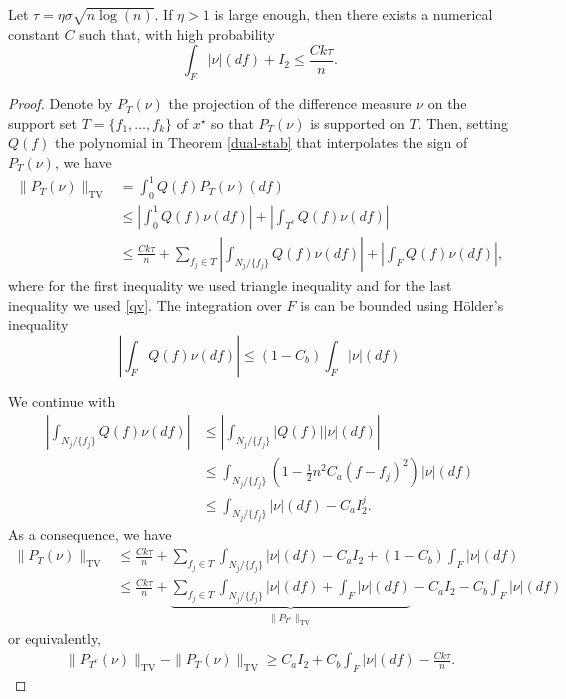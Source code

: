 \begin{lemma}
Let $\tau = \eta\sigma \sqrt{n\log(n)}$. If $\eta>1$ is large enough, then there exists a numerical constant $C$ such that, with high probability
\label{part3}
\[
\int_F{|\nu|(df)} + I_2 \leq \frac{C k \tau}{n}.
\]
\end{lemma}
\begin{proof}\label{apx:pf:I2far}
Denote by $P_T(\nu)$ the projection of the difference measure $\nu$ on the support set $T = \{f_1, \ldots, f_k\}$ of $x^\star$ so that $P_T(\nu)$ is supported on $T$. Then, setting $Q(f)$ the polynomial in Theorem \ref{dual-stab} that interpolates the sign of $P_T( \nu)$, we have
{
\begin{align*}
  \| P_T ( \nu) \|_{\mathrm{TV}} & =  \int_0^1 Q ( f) P_T ( \nu) ( d f)\\
  & \leq  \left| \int_0^1 Q ( f) \nu ( d f) \right| + \left|
  \int_{T^c} Q ( f) \nu ( d f) \right|\\
  & \leq  \frac{C k \tau}{n} + \sum_{f_j \in T} \left|
  \int_{N_j / \{ f_j \}} Q ( f) \nu ( d f) \right| + \left|
  \int_F Q ( f) \nu ( d f) \right|,
\end{align*}}
where for the first inequality we used triangle inequality and for the last inequality we used \eqref{qv}. 
The integration over $F$ is can be bounded using H\"{o}lder's inequality
\[
  \left| \int_{F} Q ( f) \nu ( d f) \right|  
  \leq  ( 1 - C_b) \int_F |\nu|(df)
\]

We continue with
{
\begin{align*}
  \left| \int_{N_j / \{ f_j \}} Q ( f) \nu ( d f) \right| 
  & \leq  \left| \int_{N_j / \{ f_j \}} | Q ( f) | | \nu | ( d f) \right|\\
  & \leq  \int_{N_j / \{ f_j \}} ( 1 - \tfrac{1}{2}n^2 C_a ( f - f_j)^2) | \nu | ( d f)\\
  & \leq \int_{N_j / \{ f_j \}} | \nu | ( d f) - C_a I_2^j.
\end{align*}
}
As a consequence, we have
{
\begin{align*}
  \nonumber \| P_T ( \nu) \|_{\mathrm{TV}} & \leq  \frac{C k \tau}{n} + \sum_{f_j
  \in T} \int_{N_j / \{ f_j \}} | \nu | ( d f) - C_a
  I_2 + ( 1 - C_b) \int_F |\nu|(df) \nonumber\\
 & \leq  \frac{C k \tau}{n} + \underbrace{\sum_{f_j
  \in T} \int_{N_j / \{ f_j \}} | \nu | ( d f) + \int_F |\nu|(df)}_{\|P_{T^c}\|_{\mathrm{TV}}} - C_a
 I_2  - C_b \int_F |\nu|(df)
\end{align*}
}
or equivalently,
\begin{align}
  \label{eqn:lower}
\|P_{T^c}(\nu) \|_{\mathrm{TV}} - \|P_T(\nu)\|_{\mathrm{TV}} \geq C_a I_2 + C_b \int_F |\nu|(df) - \frac{C k\tau}{n}.
\end{align}


\end{proof}
